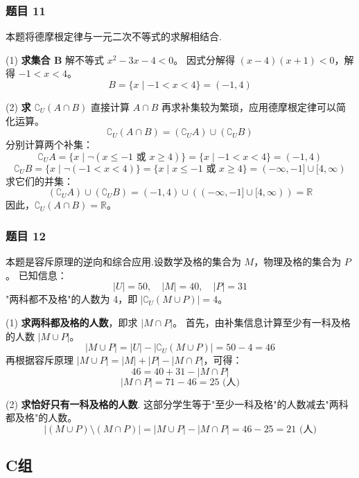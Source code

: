 \subsubsection*{题目 11}
\begin{solution}
	本题将德摩根定律与一元二次不等式的求解相结合.
	
	(1) \textbf{求集合 B}
	解不等式 $x^2-3x-4<0$。
	因式分解得 $(x-4)(x+1)<0$，解得 $-1 < x < 4$。
	\[ B=\{x \mid -1 < x < 4\} = (-1, 4) \]
	
	(2) \textbf{求 $\complement_U(A \cap B)$}
	直接计算 $A \cap B$ 再求补集较为繁琐，应用德摩根定律可以简化运算。
	\[ \complement_U(A \cap B) = (\complement_U A) \cup (\complement_U B) \]
	分别计算两个补集：
	\[ \complement_U A = \{x \mid \neg(x \le -1 \text{ 或 } x \ge 4)\} = \{x \mid -1 < x < 4\} = (-1, 4) \]
	\[ \complement_U B = \{x \mid \neg(-1 < x < 4)\} = \{x \mid x \le -1 \text{ 或 } x \ge 4\} = (-\infty, -1] \cup [4, \infty) \]
	求它们的并集：
	\[ (\complement_U A) \cup (\complement_U B) = (-1, 4) \cup \left( (-\infty, -1] \cup [4, \infty) \right) = \mathbb{R} \]
	因此，$\complement_U(A \cap B) = \mathbb{R}$。
\end{solution}

\subsubsection*{题目 12}
\begin{solution}
	本题是容斥原理的逆向和综合应用.设数学及格的集合为 $M$，物理及格的集合为 $P$。
	已知信息：
	\[ |U|=50, \quad |M|=40, \quad |P|=31 \]
	"两科都不及格"的人数为 4，即 $|\complement_U(M \cup P)|=4$。
	
	(1) \textbf{求两科都及格的人数}，即求 $|M \cap P|$。
	首先，由补集信息计算至少有一科及格的人数 $|M \cup P|$。
	\[ |M \cup P| = |U| - |\complement_U(M \cup P)| = 50 - 4 = 46 \]
	再根据容斥原理 $|M \cup P| = |M| + |P| - |M \cap P|$，可得：
	\[ 46 = 40 + 31 - |M \cap P| \]
	\[ |M \cap P| = 71 - 46 = 25 \text{ (人)} \]
	
	(2) \textbf{求恰好只有一科及格的人数}.
	这部分学生等于"至少一科及格"的人数减去"两科都及格"的人数。
	\[ |(M \cup P) \setminus (M \cap P)| = |M \cup P| - |M \cap P| = 46 - 25 = 21 \text{ (人)} \]
\end{solution}

\subsection*{C组}


